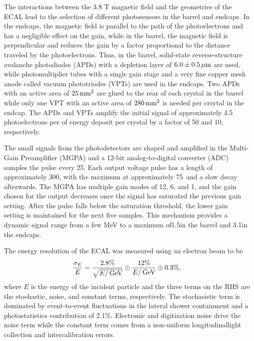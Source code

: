 The interactions between the 3.8 T magnetic field and the geometries of the ECAL lead to the selection of different photosensors in the barrel and endcaps.
In the endcaps, the magnetic field is parallel to the path of the photoelectrons and has a negligible effect on the gain, while in the barrel, the magnetic field is perpendicular and reduces the gain by a factor proportional to the distance traveled by the photoelectrons.
Thus, in the barrel, solid-state reverse-structure avalanche photodiodes (APDs) with a depletion layer of $6.0\pm0.5\,\mu\text{m}$ are used, while photomultiplier tubes with a single gain stage and a very fine copper mesh anode called vacuum phototriodes (VPTs) are used in the endcaps. 
Two APDs with an active area of $25\,\text{mm}^2$ are glued to the rear of each crystal in the barrel while only one VPT with an active area of $280\,\text{mm}^2$ is needed per crsytal in the endcap.
The APDs and VPTs amplify the initial signal of approximately 4.5 photoelectrons per \MeV of energy deposit per crystal by a factor of 50 and 10, respectively. 

The small signals from the photodetectors are shaped and amplified in the Multi-Gain Preamplifier (MGPA) and a 12-bit analog-to-digital converter (ADC) samples the pulse every 25\ns.
Each output voltage pulse has a length of approximately 300\ns, with the maximum at approximately 75\ns\ and a slow decay afterwards. 
The MGPA has multiple gain modes of 12, 6, and 1, and the gain chosen for the output decreases once the signal has saturated the previous gain setting.
After the pulse falls below the saturation threshold, the lower gain setting is maintained for the next five samples.
This mechanism provides a dynamic signal range from a few MeV to a maximum of1.5\TeV in the barrel and 3.1\TeV in the endcaps.

The energy resolution of the ECAL was measured using an electron beam to be
\begin{equation}
  \frac{\sigma_E}{E} = \frac{2.8\%}{\sqrt{E/\,\text{Ge\hspace{-.08em}V}}} \oplus \frac{12\%}{E/\,\text{Ge\hspace{-.08em}V}} \oplus 0.3\%,
\end{equation}
where $E$ is the energy of the incident particle and the three terms on the RHS are the stochastic, noise, and constant terms, respectively.
The stochasistic term is dominated by event-to-event fluctuations in the lateral shower containment and a photostatistics contribution of 2.1\%.
Electronic and digitization noise drive the noise term while the constant term comes from a non-uniform longitudinallight collection and intercalibration errors.

